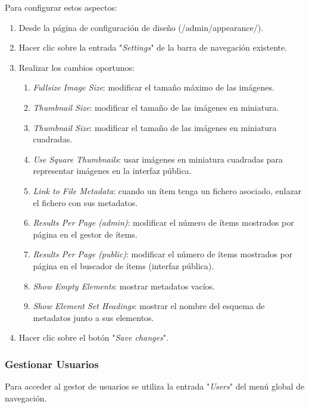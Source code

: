 \documentclass[
]{article}
\providecommand{\tightlist}{%
  \setlength{\itemsep}{0pt}\setlength{\parskip}{0pt}}
\begin{document}
Para configurar estos aspectos:

\begin{enumerate}
\def\labelenumi{\arabic{enumi}.}
\tightlist
\item
  Desde la página de configuración de diseño ({/admin/appearance/}).
\item
  Hacer clic sobre la entrada "\emph{Settings}" de la barra de
  navegación existente.
\item
  Realizar los cambios oportunos:

  \begin{enumerate}
  \def\labelenumii{\alph{enumii}.}
  \tightlist
  \item
    \emph{Fullsize Image Size}: modificar el tamaño máximo de las
    imágenes.
  \item
    \emph{Thumbnail Size}: modificar el tamaño de las imágenes en
    miniatura.
  \item
    \emph{Thumbnail Size}: modificar el tamaño de las imágenes en
    miniatura cuadradas.
  \item
    \emph{Use Square Thumbnails}: usar imágenes en miniatura cuadradas
    para representar imágenes en la interfaz pública.
  \item
    \emph{Link to File Metadata}: cuando un ítem tenga un fichero
    asociado, enlazar el fichero con sus metadatos.
  \item
    \emph{Results Per Page (admin)}: modificar el número de ítems
    mostrados por página en el gestor de ítems.
  \item
    \emph{Results Per Page (public)}: modificar el número de ítems
    mostrados por página en el buscador de ítems (interfaz pública).
  \item
    \emph{Show Empty Elements}: mostrar metadatos vacíos.
  \item
    \emph{Show Element Set Headings}: mostrar el nombre del esquema de
    metadatos junto a sus elementos.
  \end{enumerate}
\item
  Hacer clic sobre el botón "\emph{Save changes}".
\end{enumerate}

\hypertarget{gestionar-usuarios}{%
\subsubsection{Gestionar Usuarios}\label{gestionar-usuarios}}

Para acceder al gestor de usuarios se utiliza la entrada "\emph{Users}"
del menú global de navegación.
\end{document}
